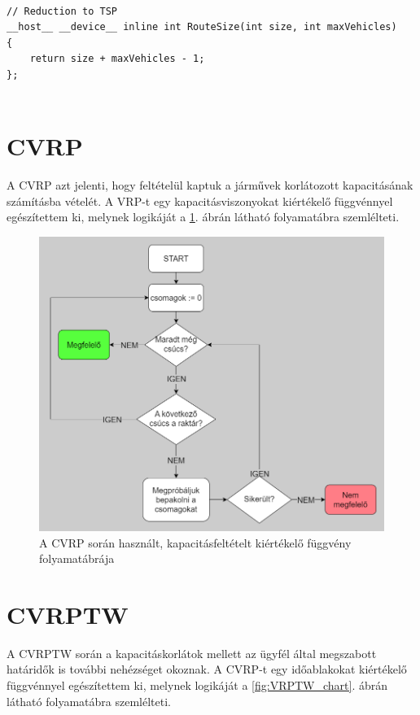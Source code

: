 \begin{lstlisting}[style=CStyle,showstringspaces=false]
	
// Reduction to TSP
__host__ __device__ inline int RouteSize(int size, int maxVehicles)
{
	return size + maxVehicles - 1;
};	
	
\end{lstlisting} 

\section{CVRP}

A CVRP azt jelenti, hogy feltételül kaptuk a járművek korlátozott kapacitásának számításba vételét. A VRP-t egy kapacitásviszonyokat kiértékelő függvénnyel egészítettem ki, melynek logikáját a \ref{fig:CVRP_chart}. ábrán látható folyamatábra szemlélteti.

\begin{figure}[ht!]
	\centering
	\includegraphics[width=150mm, keepaspectratio]{figures/Capacity.drawio.png}
	\caption{A CVRP során használt, kapacitásfeltételt kiértékelő függvény folyamatábrája }
	\label{fig:CVRP_chart}
\end{figure}

\section{CVRPTW}

A CVRPTW során a kapacitáskorlátok mellett az ügyfél által megszabott határidők is további nehézséget okoznak. A CVRP-t egy időablakokat kiértékelő függvénnyel egészítettem ki, melynek logikáját a \ref{fig:VRPTW_chart}. ábrán látható folyamatábra szemlélteti.

